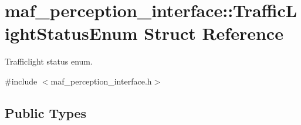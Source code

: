 \hypertarget{structmaf__perception__interface_1_1TrafficLightStatusEnum}{}\section{maf\+\_\+perception\+\_\+interface\+:\+:Traffic\+Light\+Status\+Enum Struct Reference}
\label{structmaf__perception__interface_1_1TrafficLightStatusEnum}


Trafficlight status enum.  




{\ttfamily \#include $<$maf\+\_\+perception\+\_\+interface.\+h$>$}

\subsection*{Public Types}

